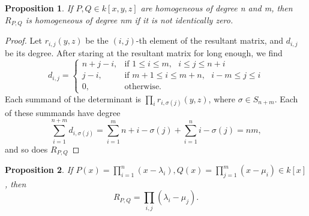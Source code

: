 \documentclass{article}
\newtheorem{proposition}{Proposition}
\theoremstyle{remark}
\begin{document}
\begin{proposition} 
If $P,Q\in k[x,y,z]$ are homogeneous of degree n and m, then $R_{P,Q}$ is homogeneous of degree nm if it is not identically zero.
\end{proposition}
\begin{proof}
Let $r_{i,j}(y,z)$ be the $(i,j)$-th element of the resultant matrix, and $d_{i,j}$ be its degree. After staring at the resultant matrix for long enough, we find
\begin{equation*}
  d_{i,j}=\begin{cases}
    n+j-i, & \text{if $1\leq i \leq m,$ $i\leq j\leq n+i$}\\
    j-i, & \text{if $m+1 \leq i \leq m+n,$ $i-m\leq j\leq i$}\\
    0, & \text{otherwise}.
  \end{cases}
\end{equation*}
Each summand of the determinant is $\prod_i r_{i,\sigma (j)}(y,z)$, where $\sigma \in S_{n+m}$. Each of these summands have degree 
\begin{equation*}
\sum_{i=1}^{n+m} d_{i,\sigma (j)}=\sum_{i=1}^{m} n+i-\sigma (j) + \sum_{i=1}^{n} i - \sigma (j) = nm, 
\end{equation*}
and so does $R_{P,Q}$
\end{proof}
\begin{proposition}
If $P(x)=\prod_{i=1}^{n} (x-\lambda_i),Q(x)=\prod_{j=1}^{m} (x-\mu_i)\in k[x]$, then
\begin{equation*}
R_{P,Q}=\prod_{i,j}(\lambda_i - \mu_j).
\end{equation*}
\end{proposition}
\end{document}
